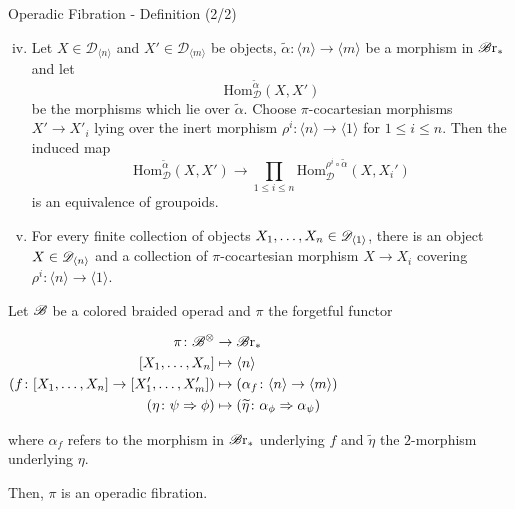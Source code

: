 \begin{frame}{Operadic Fibration - Definition (2/2)}
    \small{\begin{defin}
        \begin{enumerate}[(i)]
            \setcounter{enumi}{3}
            \item Let $X \in \mathcal{D}_{\langle n \rangle}$ and $X' \in
            \mathcal{D}_{\langle m \rangle}$ be objects, $\widetilde{\alpha} :
            \langle n \rangle \to \langle m \rangle$ be a morphism in
            $\mathscr{B} \text{r}_{\ast}$ and let 
            $$\mathrm{Hom}_{\mathcal{D}}^{\widetilde{\alpha}}(X, X')$$ be the
            morphisms which lie over $\widetilde{\alpha}$. Choose
            $\pi$-cocartesian morphisms $X' \to X'_i$ lying over the inert
            morphism $\rho^i \colon \langle n \rangle \to \langle 1 \rangle$ for
            $1 \leq i \leq n$. Then the induced map
            \[
            \mathrm{Hom}_{\mathcal{D}}^{\widetilde{\alpha}}(X, X') \to \prod_{1 \leq i \leq n} \mathrm{Hom}_{\mathcal{D}}^{\rho^i \circ \widetilde{\alpha}}(X, X_i')
            \]
            is an equivalence of groupoids.
            \item For every finite collection of objects $X_1, \dots, X_n \in
            \mathscr{D}_{\langle 1 \rangle}$, there is an object $X \in \mathscr{D}_{\langle n
            \rangle}$ and a collection of $\pi$-cocartesian morphism $X \to X_i$
            covering $\rho^i \colon \langle n \rangle \to \langle 1 \rangle$.
        \end{enumerate}
    \end{defin}}
\end{frame}

\begin{frame}[fragile]
    \begin{prop}
    Let $\mathscr{B}$ be a colored braided operad and $\pi$ the forgetful functor
    
    \vspace{0.3cm}

    $\begin{aligned} \pi \colon \mathscr{B}^{\otimes} &\to \mathscr{B} \text{r}_{\ast} \\
        [X_1, \dots, X_n] &\mapsto \langle n \rangle \\
        (f \colon [X_1, \dots, X_n] \to [X_1', \dots, X_m']) &\mapsto (\alpha_f
        \colon \langle n \rangle \to \langle m \rangle) \\
        (\eta \colon \psi \Rightarrow \phi) &\mapsto (\widetilde{\eta} \colon
    \alpha_{\phi} \Rightarrow \alpha_{\psi}) \end{aligned}$

    \vspace{0.5cm}

    where $\alpha_f$ refers to the morphism in $\mathscr{B} \text{r}_{\ast}$ underlying $f$ and
    $\widetilde{\eta}$ the $2$-morphism underlying $\eta$. 
    \vspace{0.5cm}

    Then, $\pi$ is an operadic fibration.
\end{prop}
\end{frame}


